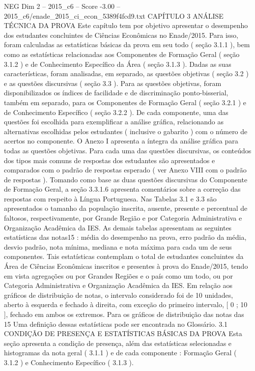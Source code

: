 \begin{textsample}{NEG Dim 2 – 2015\_c6 – Score -3.00 – 2015\_c6/enade\_2015\_ci\_econ\_5389f4fcd9.txt}  \label{ex:f2_neg_191}
CAPÍTULO 3 ANÁLISE TÉCNICA DA PROVA Este capítulo tem por objetivo apresentar o desempenho dos estudantes concluintes de Ciências Econômicas no Enade/2015.
Para isso, foram calculadas as estatísticas básicas da prova em seu todo ( seção 3.1.1 ), bem como as estatísticas relacionadas aos Componentes de Formação Geral ( seção 3.1.2 ) e de Conhecimento Específico da Área ( seção 3.1.3 ).
Dadas as suas características, foram analisadas, em separado, as questões objetivas ( seção 3.2 ) e as questões discursivas ( seção 3.3 ).
Para as questões objetivas, foram disponibilizados os índices de facilidade e de discriminação ponto-bisserial, também em separado, para os Componentes de Formação Geral ( seção 3.2.1 ) e de Conhecimento Específico ( seção 3.2.2 ).
De cada componente, uma das questões foi escolhida para exemplificar a análise gráfica, relacionando as alternativas escolhidas pelos estudantes ( inclusive o gabarito ) com o número de acertos no componente.
O Anexo I apresenta a íntegra da análise gráfica para todas as questões objetivas.
Para cada uma das questões discursivas, os conteúdos dos tipos mais comuns de respostas dos estudantes são apresentados e comparados com o padrão de respostas esperado ( ver Anexo VIII com o padrão de respostas ).
Tomando como base as duas questões discursivas do Componente de Formação Geral, a seção 3.3.1.6 apresenta comentários sobre a correção das respostas com respeito à Língua Portuguesa.
Nas Tabelas 3.1 e 3.3 são apresentados o tamanho da população inscrita, ausente, presente e percentual de faltosos, respectivamente, por Grande Região e por Categoria Administrativa e Organização Acadêmica da IES.
As demais tabelas apresentam as seguintes estatísticas das notas15 : média do desempenho na prova, erro padrão da média, desvio padrão, nota mínima, mediana e nota máxima para cada um de seus componentes.
Tais estatísticas contemplam o total de estudantes concluintes da Área de Ciências Econômicas inscritos e presentes à prova do Enade/2015, tendo em vista agregações ou por Grandes Regiões e o país como um todo, ou por Categoria Administrativa e Organização Acadêmica da IES.
Em relação aos gráficos de distribuição de notas, o intervalo considerado foi de 10 unidades, aberto à esquerda e fechado à direita, com exceção do primeiro intervalo, [ 0 ; 10 ], fechado em ambos os extremos.
Para os gráficos de distribuição das notas das 15 Uma definição dessas estatísticas pode ser encontrada no Glossário. 3.1 CONDIÇÃO DE PRESENÇA E ESTATÍSTICAS BÁSICAS DA PROVA Esta seção apresenta a condição de presença, além das estatísticas selecionadas e histogramas da nota geral ( 3.1.1 ) e de cada componente : Formação Geral ( 3.1.2 ) e Conhecimento Específico ( 3.1.3 ).

\end{textsample}
